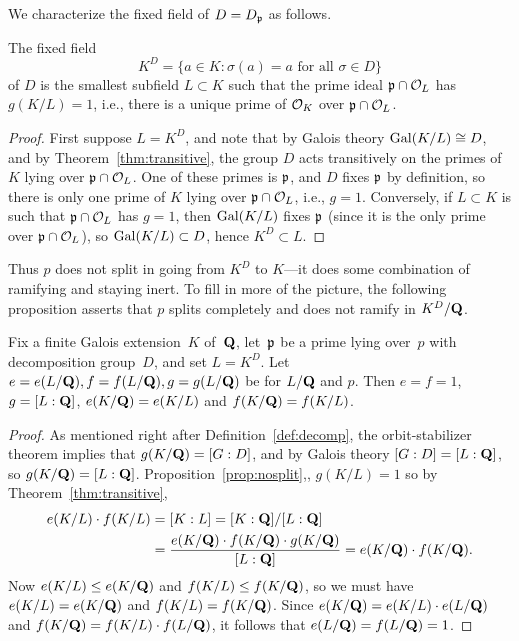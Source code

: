 We characterize the fixed field of $D=D_{\mathfrak{p}}$ as follows.
\begin{proposition}\label{prop:nosplit}
The fixed field
$$K^D=\{a \in K : \sigma(a) = a\text{ for all }
\sigma \in D\}$$
of $D$
is the smallest subfield $L\subset K$ such that 
the prime ideal $\mathfrak{p}\cap\mathcal{O}_L$ 
has $g(K/L)=1$, i.e., there is a unique
prime of $\mathcal{O}_K$ over $\mathfrak{p}\cap\mathcal{O}_L$.
\end{proposition}
\begin{proof}
First suppose $L=K^D$, and note that by Galois theory $\operatorname{Gal}(K/L)\cong
D$, and by Theorem~\ref{thm:transitive}, the group $D$
acts transitively on the primes of $K$ lying over $\mathfrak{p}\cap\mathcal{O}_L$.  One of
these primes is $\mathfrak{p}$, and $D$ fixes $\mathfrak{p}$ by definition, so there is
only one prime of $K$ lying over $\mathfrak{p}\cap\mathcal{O}_L$, i.e., $g=1$.  
Conversely, if $L\subset K$ is such that $\mathfrak{p}\cap\mathcal{O}_L$
has $g=1$, then $\operatorname{Gal}(K/L)$ fixes $\mathfrak{p}$ (since it is the only
prime over $\mathfrak{p}\cap\mathcal{O}_L$), so $\operatorname{Gal}(K/L)\subset D$, hence $K^D\subset L$.
\end{proof}
Thus $p$ does not split in going from $K^D$ to $K$---it does some
combination of ramifying and staying inert.  To fill in more of
the picture, the following proposition asserts that $p$ splits
completely and does not ramify in $K^D/\mathbf{Q}$.
\begin{proposition}\label{prop:noresidue}
Fix a finite Galois extension~$K$ of~$\mathbf{Q}$, 
let~$\mathfrak{p}$ be a prime lying over~$p$ with decomposition group~$D$,
and set $L=K^D$.
Let $e=e(L/\mathbf{Q}),f=f(L/\mathbf{Q}),g=g(L/\mathbf{Q})$ be for $L/\mathbf{Q}$ and $p$. 
Then $e=f=1$, $g=[L:\mathbf{Q}]$, $e(K/\mathbf{Q})=e(K/L)$ and $f(K/\mathbf{Q})=f(K/L)$.
\end{proposition}
\begin{proof}
As mentioned right after Definition~\ref{def:decomp}, the
orbit-stabilizer theorem implies that $g(K/\mathbf{Q})=[G:D]$, and 
by Galois theory $[G:D]=[L:\mathbf{Q}]$, so $g(K/\mathbf{Q}) = [L:\mathbf{Q}]$.
Proposition~\ref{prop:nosplit},, $g(K/L)=1$ so 
by Theorem~\ref{thm:transitive}, 
\begin{align*}
 e(K/L)\cdot f(K/L) &= [K:L]
   =[K:\mathbf{Q}]/[L:\mathbf{Q}] \\
&= \frac{e(K/\mathbf{Q})\cdot f(K/\mathbf{Q}) \cdot g(K/\mathbf{Q})}{[L:\mathbf{Q}]}
   = e(K/\mathbf{Q})\cdot f(K/\mathbf{Q}).
\end{align*}
Now $e(K/L)\leq e(K/\mathbf{Q})$ and $f(K/L)\leq f(K/\mathbf{Q})$, so 
we must have $e(K/L)=e(K/\mathbf{Q})$ and $f(K/L)=f(K/\mathbf{Q})$.  
Since $e(K/\mathbf{Q})=e(K/L)\cdot e(L/\mathbf{Q})$ and $f(K/\mathbf{Q})=f(K/L)\cdot f(L/\mathbf{Q})$,
it follows that $e(L/\mathbf{Q})=f(L/\mathbf{Q}) = 1$.
\end{proof}

